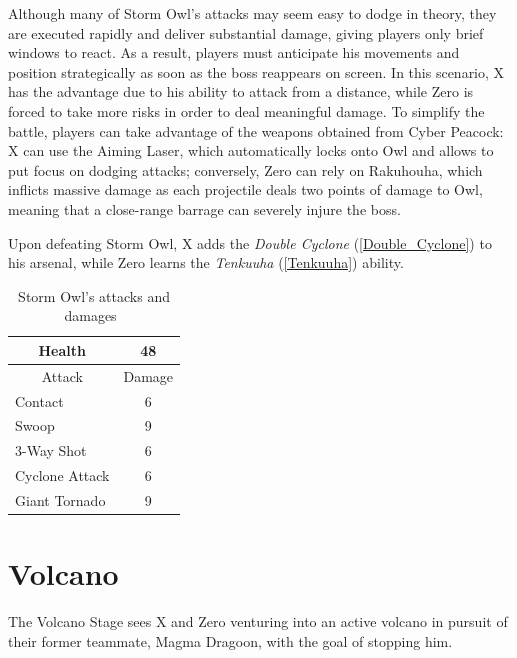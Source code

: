 Although many of Storm Owl’s attacks may seem easy to dodge in theory, they are executed rapidly and deliver substantial damage, giving players only brief windows to react. As a result, players must anticipate his movements and position strategically as soon as the boss reappears on screen. In this scenario, X has the advantage due to his ability to attack from a distance, while Zero is forced to take more risks in order to deal meaningful damage. To simplify the battle, players can take advantage of the weapons obtained from Cyber Peacock: X can use the Aiming Laser, which automatically locks onto Owl and allows to put focus on dodging attacks; conversely, Zero can rely on Rakuhouha, which inflicts massive damage as each projectile deals two points of damage to Owl, meaning that a close-range barrage can severely injure the boss.

Upon defeating Storm Owl, X adds the \emph{Double Cyclone} (\ref{Double_Cyclone}) to his arsenal, while Zero learns the \emph{Tenkuuha} (\ref{Tenkuuha}) ability.


\begin{table}[htp]
	\centering
	\begin{tabular}[h]{l c}
		\toprule
		\multicolumn{1}{c}{Health}  & 48\\
		\midrule
		\multicolumn{1}{c}{Attack} & \multicolumn{1}{c}{Damage}\\
		Contact & 6 \\
		Swoop& 9 \\
		3-Way Shot & 6 \\
		Cyclone Attack& 6\\
		Giant Tornado& 9\\
		\bottomrule
	\end{tabular}
	\caption{Storm Owl's attacks and damages~\cite{book:Compendium,wiki:Storm_owl}}
\end{table}
 

\section{Volcano}\label{volcano}
The Volcano Stage sees X and Zero venturing into an active volcano in pursuit of their former teammate, Magma Dragoon, with the goal of stopping him.

